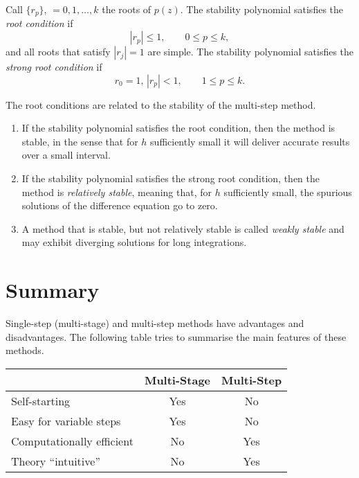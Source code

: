 Call $\{r_p\}$, $=0,1,\ldots,k$ the roots of $p(z)$.  The stability
polynomial satisfies the \textit{root condition} if
%
\begin{equation*}
  |r_p| \le 1, \qquad 0 \le p \le k ,
\end{equation*}
%
and all roots that satisfy $|r_j|=1$ are simple.  The stability
polynomial satisfies the \textit{strong root condition} if
%
\begin{equation*}
  r_0 = 1, \, |r_p| < 1, \qquad 1 \le p \le k.
\end{equation*}

The root conditions are related to the stability of the multi-step
method.

\begin{enumerate}
\item If the stability polynomial satisfies the root condition, then
  the method is stable, in the sense that for $h$ sufficiently small
  it will deliver accurate results over a small interval.
\item If the stability polynomial satisfies the strong root condition,
  then the method is \textit{relatively stable}, meaning that, for $h$
  sufficiently small, the spurious solutions of the difference
  equation go to zero.
\item A method that is stable, but not relatively stable is called
  \textit{weakly stable} and may exhibit diverging solutions for long
  integrations.
\end{enumerate}

\medskip

\section{Summary}

Single-step (multi-stage) and multi-step methods have advantages and
disadvantages.  The following table tries to summarise the main
features of these methods.

\smallskip

\begin{center}
  \begin{tabular}{l|c c}
    & \textbf{Multi-Stage} & \textbf{Multi-Step} \\ \hline
    Self-starting & Yes & No \\
    Easy for variable steps & Yes & No \\
    Computationally efficient & No & Yes \\
    Theory ``intuitive'' & No & Yes
  \end{tabular}
\end{center}

